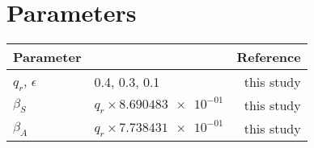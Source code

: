 \documentclass[a4paper,10pt, 5p]{elsarticle}
\begin{document}
    \section{Parameters}
      \begin{table*}
        \centering
        \begin{tabular}{@{}llr@{}}
        \toprule
            Parameter
            &   \centering{Median}
            &   Reference
            \\
            \midrule
              $q_r$, $\epsilon$
                &
                  \num{.4}, \num{.3}, \num{.1}
                &
                  this study
            \\
                $\beta_S$
                & $q_r \times \num{8.690483e-01} $
                & this study
            \\
                $\beta_A$
                & $q_r \times \num{7.738431e-01}$
                & this study
            

\end{tabular}
\end{table*}
\end{document}

